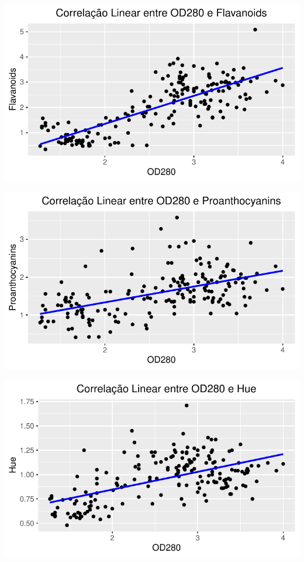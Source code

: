 \documentclass[
  letterpaper,
  DIV=11,
  numbers=noendperiod]{scrartcl}
\begin{document}
\begin{center}
\includegraphics{wines_analysis_files/figure-pdf/unnamed-chunk-16-2.pdf}
\end{center}

\begin{center}
\includegraphics{wines_analysis_files/figure-pdf/unnamed-chunk-16-3.pdf}
\end{center}

\begin{center}
\includegraphics{wines_analysis_files/figure-pdf/unnamed-chunk-16-4.pdf}
\end{center}
\end{document}
